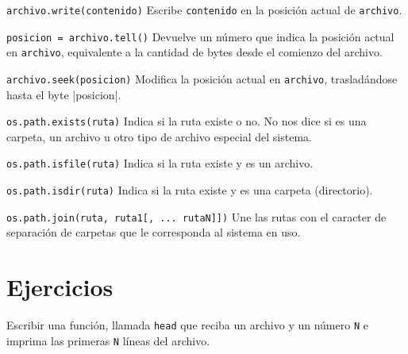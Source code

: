 \begin{referencia_python}
\begin{sintaxis}{\lstinline!archivo.write(contenido)!}
Escribe \lstinline!contenido! en la posición actual de \lstinline!archivo!.
\end{sintaxis}

\begin{sintaxis}{\lstinline!posicion = archivo.tell()!}
Devuelve un número que indica la posición actual en \lstinline!archivo!,
equivalente a la cantidad de bytes desde el comienzo del archivo.
\end{sintaxis}

\begin{sintaxis}{\lstinline!archivo.seek(posicion)!}
Modifica la posición actual en \lstinline!archivo!, trasladándose
hasta el byte |posicion|.
\end{sintaxis}

\begin{sintaxis}{\lstinline!os.path.exists(ruta)!}
Indica si la ruta existe o no.
No nos dice si es una carpeta, un archivo u otro tipo de archivo especial
del sistema.
\end{sintaxis}

\begin{sintaxis}{\lstinline!os.path.isfile(ruta)!}
Indica si la ruta existe y es un archivo.
\end{sintaxis}

\begin{sintaxis}{\lstinline!os.path.isdir(ruta)!}
Indica si la ruta existe y es una carpeta (directorio).
\end{sintaxis}

\begin{sintaxis}{\lstinline!os.path.join(ruta, ruta1[, ... rutaN]])!}
Une las rutas con el caracter de separación de carpetas que le corresponda
al sistema en uso.
\end{sintaxis}

\end{referencia_python}

\newpage
\section{Ejercicios}

\begin{ejercicio}
Escribir una función, llamada \lstinline|head| que reciba un archivo y un número
\lstinline!N! e imprima las primeras \lstinline!N! líneas del archivo.
\end{ejercicio}

